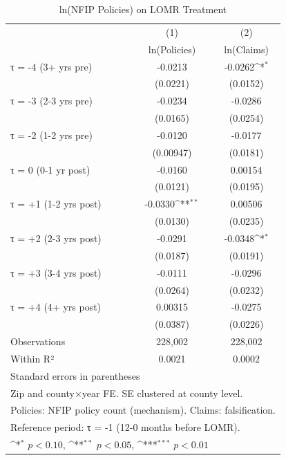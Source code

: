 \begin{table}[htbp]\centering
\def\sym#1{\ifmmode^{#1}\else\(^{#1}\)\fi}
\caption{ln(NFIP Policies) on LOMR Treatment}
\begin{tabular}{l*{2}{c}}
\hline\hline
                    &\multicolumn{1}{c}{(1)}&\multicolumn{1}{c}{(2)}\\
                    &\multicolumn{1}{c}{ln(Policies)}&\multicolumn{1}{c}{ln(Claims)}\\
\hline
τ = -4 (3+ yrs pre) &     -0.0213         &     -0.0262\sym{*}  \\
                    &    (0.0221)         &    (0.0152)         \\
[1em]
τ = -3 (2-3 yrs pre)&     -0.0234         &     -0.0286         \\
                    &    (0.0165)         &    (0.0254)         \\
[1em]
τ = -2 (1-2 yrs pre)&     -0.0120         &     -0.0177         \\
                    &   (0.00947)         &    (0.0181)         \\
[1em]
τ = 0 (0-1 yr post) &     -0.0160         &     0.00154         \\
                    &    (0.0121)         &    (0.0195)         \\
[1em]
τ = +1 (1-2 yrs post)&     -0.0330\sym{**} &     0.00506         \\
                    &    (0.0130)         &    (0.0235)         \\
[1em]
τ = +2 (2-3 yrs post)&     -0.0291         &     -0.0348\sym{*}  \\
                    &    (0.0187)         &    (0.0191)         \\
[1em]
τ = +3 (3-4 yrs post)&     -0.0111         &     -0.0296         \\
                    &    (0.0264)         &    (0.0232)         \\
[1em]
τ = +4 (4+ yrs post)&     0.00315         &     -0.0275         \\
                    &    (0.0387)         &    (0.0226)         \\
\hline
Observations        &     228,002         &     228,002         \\
Within R²           &      0.0021         &      0.0002         \\
\hline\hline
\multicolumn{3}{l}{\footnotesize Standard errors in parentheses}\\
\multicolumn{3}{l}{\footnotesize Zip and county×year FE. SE clustered at county level.}\\
\multicolumn{3}{l}{\footnotesize Policies: NFIP policy count (mechanism). Claims: falsification.}\\
\multicolumn{3}{l}{\footnotesize Reference period: τ = -1 (12-0 months before LOMR).}\\
\multicolumn{3}{l}{\footnotesize \sym{*} \(p<0.10\), \sym{**} \(p<0.05\), \sym{***} \(p<0.01\)}\\
\end{tabular}
\end{table}
